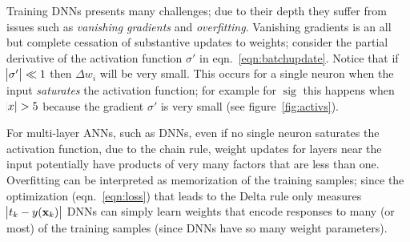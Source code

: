Training DNNs presents many challenges; due to their depth they suffer from issues such as \textit{vanishing gradients} and \textit{overfitting}.
%
Vanishing gradients is an all but complete cessation of substantive updates to weights; consider the partial derivative of the activation function \(\sigma'\) in eqn.~\eqref{eqn:batchupdate}.
%
Notice that if \(\abs{\sigma'} \ll 1\) then \(\Delta w_i\) will be very small.
%
This occurs for a single neuron when the input \textit{saturates} the activation function; for example for \(\operatorname{sig}\) this happens when \(\abs{x} > 5\) because the gradient \(\sigma'\) is very small (see figure~\ref{fig:activs}).

%
For multi-layer ANNs, such as DNNs, even if no single neuron saturates the activation function,
due to the chain rule, weight updates for layers near the input potentially have products of very many factors that are less than one.
%
Overfitting can be interpreted as memorization of the training samples; since the optimization (eqn.~\eqref{eqn:loss}) that leads to the Delta rule only measures \(\abs{t_k - y(\mathbf{x}_k)}\) DNNs can simply learn weights that encode responses to many (or most) of the training samples (since DNNs have so many weight parameters).

